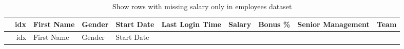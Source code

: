 \documentclass [oneside,10pt,a4paper,ngerman,BCOR10mm,headsepline,parindent,final]{scrartcl}
\begin{document}
    \begin{longtable}[]{@{}rrllllrrll@{}}
\caption{Show rows with missing salary only in employees
dataset}\tabularnewline
\toprule
\begin{minipage}[b]{0.02\columnwidth}\raggedleft
\strut
\end{minipage} & \begin{minipage}[b]{0.04\columnwidth}\raggedleft
idx\strut
\end{minipage} & \begin{minipage}[b]{0.08\columnwidth}\raggedright
First Name\strut
\end{minipage} & \begin{minipage}[b]{0.06\columnwidth}\raggedright
Gender\strut
\end{minipage} & \begin{minipage}[b]{0.08\columnwidth}\raggedright
Start Date\strut
\end{minipage} & \begin{minipage}[b]{0.11\columnwidth}\raggedright
Last Login Time\strut
\end{minipage} & \begin{minipage}[b]{0.06\columnwidth}\raggedleft
Salary\strut
\end{minipage} & \begin{minipage}[b]{0.06\columnwidth}\raggedleft
Bonus \%\strut
\end{minipage} & \begin{minipage}[b]{0.12\columnwidth}\raggedright
Senior Management\strut
\end{minipage} & \begin{minipage}[b]{0.10\columnwidth}\raggedright
Team\strut
\end{minipage}\tabularnewline
\midrule
\endfirsthead
\toprule
\begin{minipage}[b]{0.02\columnwidth}\raggedleft
\strut
\end{minipage} & \begin{minipage}[b]{0.04\columnwidth}\raggedleft
idx\strut
\end{minipage} & \begin{minipage}[b]{0.08\columnwidth}\raggedright
First Name\strut
\end{minipage} & \begin{minipage}[b]{0.06\columnwidth}\raggedright
Gender\strut
\end{minipage} & \begin{minipage}[b]{0.08\columnwidth}\raggedright
Start Date\strut
\end{minipage} & \begin{minipage}[b]{0.11\columnwidth}\raggedright

\end{minipage}
\end{longtable}
\end{document}
